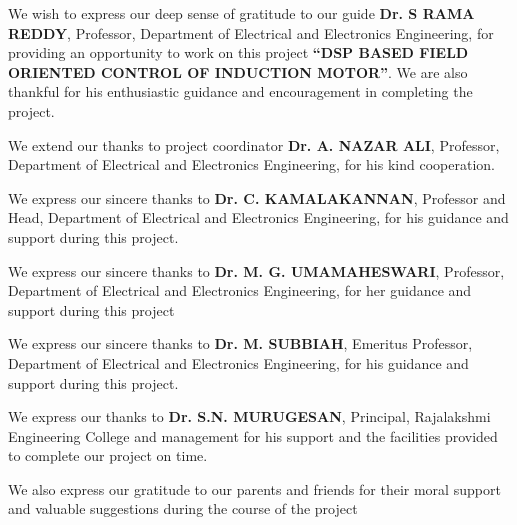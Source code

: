 

    


\vspace{1em} %

We wish to express our deep sense of gratitude to our guide \textbf{Dr. S RAMA REDDY}, Professor, Department of Electrical and Electronics Engineering, for providing an opportunity to work on this project \textbf{``DSP BASED FIELD ORIENTED CONTROL OF INDUCTION MOTOR''}. We are also thankful for his enthusiastic guidance and encouragement in completing the project.

\vspace{0.5em} %
We extend our thanks to project coordinator \textbf{Dr. A. NAZAR ALI}, Professor, Department of Electrical and Electronics Engineering, for his kind cooperation.

\vspace{0.5em} %
We express our sincere thanks to \textbf{Dr. C. KAMALAKANNAN}, Professor and Head, Department of Electrical and Electronics Engineering, for his guidance and support during this project.

\vspace{0.5em} %
We express our sincere thanks to \textbf{Dr. M. G. UMAMAHESWARI}, Professor, Department of Electrical and Electronics Engineering, for her guidance and support during this project

\vspace{0.5em} %
We express our sincere thanks to \textbf{Dr. M. SUBBIAH}, Emeritus Professor, Department of Electrical and Electronics Engineering, for his guidance and support during this project.

\vspace{0.5em} %
We express our thanks to \textbf{Dr. S.N. MURUGESAN}, Principal, Rajalakshmi Engineering College and management for his support and the facilities provided to complete our project on time.

\vspace{0.5em} %
We also express our gratitude to our parents and friends for their moral support and valuable suggestions during the course of the project


\newpage